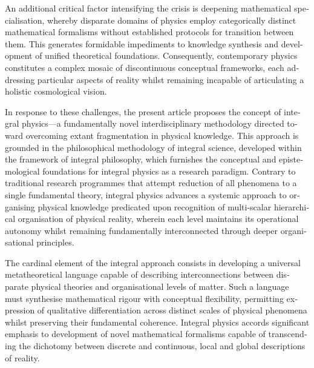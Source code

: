 \begin{english}
    An additional critical factor intensifying the crisis is deepening mathematical specialisation, whereby disparate domains of physics employ categorically distinct mathematical formalisms without established protocols for transition between them. This generates formidable impediments to knowledge synthesis and development of unified theoretical foundations. Consequently, contemporary physics constitutes a complex mosaic of discontinuous conceptual frameworks, each addressing particular aspects of reality whilst remaining incapable of articulating a holistic cosmological vision.

    In response to these challenges, the present article proposes the concept of integral physics—a fundamentally novel interdisciplinary methodology directed toward overcoming extant fragmentation in physical knowledge. This approach is grounded in the philosophical methodology of integral science, developed within the framework of integral philosophy, which furnishes the conceptual and epistemological foundations for integral physics as a research paradigm. Contrary to traditional research programmes that attempt reduction of all phenomena to a single fundamental theory, integral physics advances a systemic approach to organising physical knowledge predicated upon recognition of multi-scalar hierarchical organisation of physical reality, wherein each level maintains its operational autonomy whilst remaining fundamentally interconnected through deeper organisational principles.

    The cardinal element of the integral approach consists in developing a universal metatheoretical language capable of describing interconnections between disparate physical theories and organisational levels of matter. Such a language must synthesise mathematical rigour with conceptual flexibility, permitting expression of qualitative differentiation across distinct scales of physical phenomena whilst preserving their fundamental coherence. Integral physics accords significant emphasis to development of novel mathematical formalisms capable of transcending the dichotomy between discrete and continuous, local and global descriptions of reality.


\end{english}
